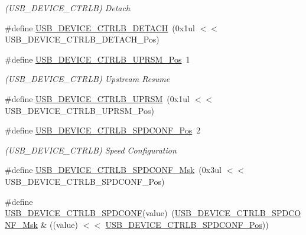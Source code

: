 \begin{DoxyCompactItemize}
\begin{DoxyCompactList}\small\item\em (U\+S\+B\+\_\+\+D\+E\+V\+I\+C\+E\+\_\+\+C\+T\+R\+LB) Detach \end{DoxyCompactList}\item 
\#define \mbox{\hyperlink{group___s_a_m_d21___u_s_b_gad4d46a1d9d15b8dfad805101df8d4968}{U\+S\+B\+\_\+\+D\+E\+V\+I\+C\+E\+\_\+\+C\+T\+R\+L\+B\+\_\+\+D\+E\+T\+A\+CH}}~(0x1ul $<$$<$ U\+S\+B\+\_\+\+D\+E\+V\+I\+C\+E\+\_\+\+C\+T\+R\+L\+B\+\_\+\+D\+E\+T\+A\+C\+H\+\_\+\+Pos)
\item 
\#define \mbox{\hyperlink{group___s_a_m_d21___u_s_b_gab93be7942d56b8a9b058a68210fc8564}{U\+S\+B\+\_\+\+D\+E\+V\+I\+C\+E\+\_\+\+C\+T\+R\+L\+B\+\_\+\+U\+P\+R\+S\+M\+\_\+\+Pos}}~1
\begin{DoxyCompactList}\small\item\em (U\+S\+B\+\_\+\+D\+E\+V\+I\+C\+E\+\_\+\+C\+T\+R\+LB) Upstream Resume \end{DoxyCompactList}\item 
\#define \mbox{\hyperlink{group___s_a_m_d21___u_s_b_ga5082e4a3546109b3e4a120c74b7b66d4}{U\+S\+B\+\_\+\+D\+E\+V\+I\+C\+E\+\_\+\+C\+T\+R\+L\+B\+\_\+\+U\+P\+R\+SM}}~(0x1ul $<$$<$ U\+S\+B\+\_\+\+D\+E\+V\+I\+C\+E\+\_\+\+C\+T\+R\+L\+B\+\_\+\+U\+P\+R\+S\+M\+\_\+\+Pos)
\item 
\#define \mbox{\hyperlink{group___s_a_m_d21___u_s_b_gab5b9688f10e2ab8aa52f42628139b6eb}{U\+S\+B\+\_\+\+D\+E\+V\+I\+C\+E\+\_\+\+C\+T\+R\+L\+B\+\_\+\+S\+P\+D\+C\+O\+N\+F\+\_\+\+Pos}}~2
\begin{DoxyCompactList}\small\item\em (U\+S\+B\+\_\+\+D\+E\+V\+I\+C\+E\+\_\+\+C\+T\+R\+LB) Speed Configuration \end{DoxyCompactList}\item 
\#define \mbox{\hyperlink{group___s_a_m_d21___u_s_b_gac9185a57c892384a6a0be4ef054d928c}{U\+S\+B\+\_\+\+D\+E\+V\+I\+C\+E\+\_\+\+C\+T\+R\+L\+B\+\_\+\+S\+P\+D\+C\+O\+N\+F\+\_\+\+Msk}}~(0x3ul $<$$<$ U\+S\+B\+\_\+\+D\+E\+V\+I\+C\+E\+\_\+\+C\+T\+R\+L\+B\+\_\+\+S\+P\+D\+C\+O\+N\+F\+\_\+\+Pos)
\item 
\#define \mbox{\hyperlink{group___s_a_m_d21___u_s_b_gaa18ba1dd5ddd71fa9f164cb6305f1992}{U\+S\+B\+\_\+\+D\+E\+V\+I\+C\+E\+\_\+\+C\+T\+R\+L\+B\+\_\+\+S\+P\+D\+C\+O\+NF}}(value)~(\mbox{\hyperlink{group___s_a_m_d21___u_s_b_gac9185a57c892384a6a0be4ef054d928c}{U\+S\+B\+\_\+\+D\+E\+V\+I\+C\+E\+\_\+\+C\+T\+R\+L\+B\+\_\+\+S\+P\+D\+C\+O\+N\+F\+\_\+\+Msk}} \& ((value) $<$$<$ \mbox{\hyperlink{group___s_a_m_d21___u_s_b_gab5b9688f10e2ab8aa52f42628139b6eb}{U\+S\+B\+\_\+\+D\+E\+V\+I\+C\+E\+\_\+\+C\+T\+R\+L\+B\+\_\+\+S\+P\+D\+C\+O\+N\+F\+\_\+\+Pos}}))

\end{DoxyCompactItemize}
